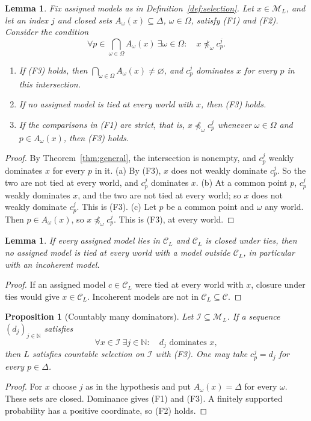\documentclass[11pt]{article}
\newtheorem{lemma}[theorem]{Lemma}
\newtheorem{proposition}[theorem]{Proposition}
\theoremstyle{definition}
\theoremstyle{remark}
\newcommand{\M}{\mathcal M}
\newcommand{\C}{\mathcal C}
\newcommand{\I}{\mathcal I}
\begin{document}
\begin{lemma}\label{lem:no-tie}
Fix assigned models as in Definition~\ref{def:selection}. Let $x\in\M_L$, and let an index $j$ and closed sets $A_\omega(x)\subseteq\Delta$, $\omega\in\Omega$, satisfy (F1) and (F2). Consider the condition
\begin{equation}
\forall p\in\bigcap_{\omega\in\Omega}A_\omega(x)\ \exists\omega\in\Omega:\quad x\not\preceq_\omega c^j_p.\tag{F3}\label{eq:f-notie}
\end{equation}
\begin{enumerate}[label=(\alph*)]
\item If (F3) holds, then $\bigcap_{\omega\in\Omega}A_\omega(x)\ne\varnothing$, and $c^j_p$ dominates $x$ for every $p$ in this intersection.
\item If no assigned model is tied at every world with $x$, then (F3) holds.
\item If the comparisons in (F1) are strict, that is, $x\not\preceq_\omega c^j_p$ whenever $\omega\in\Omega$ and $p\in A_\omega(x)$, then (F3) holds.
\end{enumerate}
\end{lemma}
\begin{proof}
By Theorem~\ref{thm:general}, the intersection is nonempty, and $c^j_p$ weakly dominates $x$ for every $p$ in it. (a) By (F3), $x$ does not weakly dominate $c^j_p$. So the two are not tied at every world, and $c^j_p$ dominates $x$. (b) At a common point $p$, $c^j_p$ weakly dominates $x$, and the two are not tied at every world; so $x$ does not weakly dominate $c^j_p$. This is (F3). (c) Let $p$ be a common point and $\omega$ any world. Then $p\in A_\omega(x)$, so $x\not\preceq_\omega c^j_p$. This is (F3), at every world.
\end{proof}

\begin{lemma}\label{lem:tie-sufficient}
If every assigned model lies in $\C_L$ and $\C_L$ is closed under ties, then no assigned model is tied at every world with a model outside $\C_L$, in particular with an incoherent model.
\end{lemma}
\begin{proof}
If an assigned model $c\in\C_L$ were tied at every world with $x$, closure under ties would give $x\in\C_L$. Incoherent models are not in $\C_L\subseteq\C$.
\end{proof}

\begin{proposition}[Countably many dominators]\label{prop:comparison}
Let $\I\subseteq\M_L$. If a sequence $(d_j)_{j\in\mathbb N}$ satisfies
\[
\forall x\in\I\ \exists j\in\mathbb N:\quad d_j\text{ dominates }x,
\]
then $L$ satisfies countable selection on $\I$ with (F3). One may take $c^j_p=d_j$ for every $p\in\Delta$.
\end{proposition}
\begin{proof}
For $x$ choose $j$ as in the hypothesis and put $A_\omega(x)=\Delta$ for every $\omega$. These sets are closed. Dominance gives (F1) and (F3). A finitely supported probability has a positive coordinate, so (F2) holds.
\end{proof}
\end{document}
